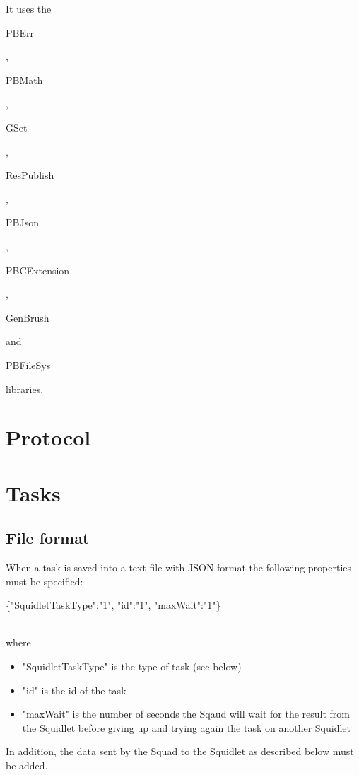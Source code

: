 It uses the \begin{ttfamily}PBErr\end{ttfamily}, \begin{ttfamily}PBMath\end{ttfamily}, \begin{ttfamily}GSet\end{ttfamily}, \begin{ttfamily}ResPublish\end{ttfamily}, \begin{ttfamily}PBJson\end{ttfamily}, \begin{ttfamily}PBCExtension\end{ttfamily}, \begin{ttfamily}GenBrush\end{ttfamily} and \begin{ttfamily}PBFileSys\end{ttfamily} libraries.\\

\section{Protocol}

\section{Tasks}

\subsection{File format}

When a task is saved into a text file with JSON format the following properties must be specified:\\
\begin{ttfamily}\{"SquidletTaskType":"1", "id":"1", "maxWait":"1"\}\end{ttfamily}\\
where
\begin{itemize}
\item "SquidletTaskType" is the type of task (see below)
\item "id" is the id of the task
\item "maxWait" is the number of seconds the Sqaud will wait for the result from the Squidlet before giving up and trying again the task on another Squidlet
\end{itemize}
In addition, the data sent by the Squad to the Squidlet as described below must be added.
 
